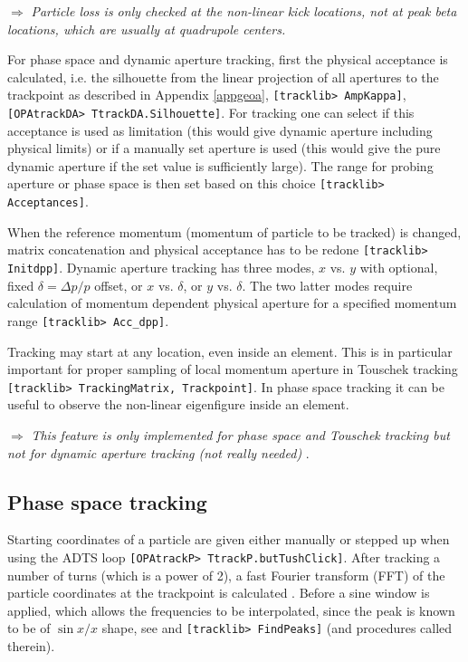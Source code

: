 \documentclass[12pt]{article}
\newcommand\todo[1]{$\Longrightarrow$ {\em #1} }
\newcommand\code[1]{{\tt [#1]}}
\begin{document}
\todo{Particle loss is only checked at the non-linear kick locations, not at peak beta locations, which are usually at quadrupole centers.}

For phase space and dynamic aperture tracking, first the physical acceptance is calculated, i.e. the silhouette from the linear projection of all apertures to the trackpoint as described in Appendix \ref{appgeoa}, \code{tracklib> AmpKappa}, \code{OPAtrackDA> TtrackDA.Silhouette}.
For tracking one can select if this acceptance is used as limitation (this would give dynamic aperture including physical limits) or if a manually set aperture is used (this would give the pure dynamic aperture if the set value is sufficiently large). The range for probing aperture or phase space is then set based on this choice \code{tracklib> Acceptances}.

When the reference momentum (momentum of particle to be tracked) is changed, matrix concatenation and physical acceptance has to be redone \code{tracklib> Initdpp}. Dynamic aperture tracking has three modes, $x$ vs. $y$ with optional, fixed $\delta=\Delta p/p$ offset, or $x$ vs. $\delta$, or $y$ vs. $\delta$. The two latter modes require calculation of momentum dependent physical aperture for a specified momentum range \code{tracklib> Acc\_dpp}.

Tracking may start at any location, even inside an element. This is in particular important for proper sampling of local momentum aperture in Touschek tracking \code{tracklib> TrackingMatrix, Trackpoint}. In phase space tracking it can be useful to observe the non-linear eigenfigure inside an element.

\todo{This feature is only implemented for phase space and Touschek tracking but not for dynamic aperture tracking (not really needed)}.

\subsection{Phase space tracking}
Starting coordinates of a particle are given either manually or stepped up when using the ADTS loop \code{OPAtrackP> TtrackP.butTushClick}. After tracking a number of turns (which is a power of 2), a fast Fourier transform (FFT) of the particle coordinates at the trackpoint is calculated \cite{numrec}. Before a sine window is applied, which allows the frequencies to be interpolated, since the peak is known to be of $\sin x/x$ shape, see \cite{jbthesis} and \code{tracklib> FindPeaks} (and procedures called therein).
\end{document}
